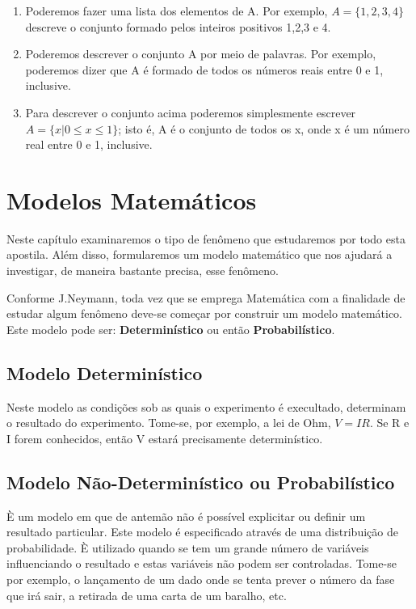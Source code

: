\documentclass[a4paper,12pt]{report}
\begin{document}
{\begin{enumerate}
    \item Poderemos fazer uma lista dos elementos de A. Por
    exemplo, $A = \{ 1,2,3,4 \}$ descreve o conjunto formado pelos
    inteiros positivos 1,2,3 e 4.
    \item Poderemos descrever o conjunto A por meio de palavras.
    Por exemplo, poderemos dizer que A é formado de todos os
    números reais entre 0 e 1, inclusive.
    \item Para descrever o conjunto acima poderemos simplesmente
    escrever $A = \{ x|0\leq x \leq 1 \}$; isto é, A é o conjunto
    de todos os x, onde x é um número real entre 0 e 1, inclusive.
\end{enumerate}







\section{Modelos Matemáticos}

Neste capítulo examinaremos o tipo de fenômeno que estudaremos por
todo esta apostila. Além disso, formularemos um modelo matemático
que nos ajudará a investigar, de maneira bastante precisa, esse
fenômeno.\vskip0.3cm

Conforme J.Neymann, toda vez que se emprega Matemática com a
finalidade de estudar algum fenômeno deve-se começar por construir
um modelo matemático. Este modelo pode ser:
\textbf{Determinístico} ou então \textbf{Probabilístico}.


\subsection{Modelo Determinístico}
Neste modelo as condições sob as quais o experimento é execultado,
determinam o resultado do experimento. Tome-se, por exemplo, a lei
de Ohm, $V = IR$. Se R e I forem conhecidos, então V estará
precisamente determinístico.


\subsection{Modelo Não-Determinístico ou Probabilístico}
È um modelo em que de antemão não é possível explicitar ou definir
um resultado particular. Este modelo é especificado através de uma
distribuição de probabilidade. È utilizado quando se tem um grande
número de variáveis influenciando o resultado e estas variáveis
não podem ser controladas. Tome-se por exemplo, o lançamento de um
dado onde se tenta prever o número da fase que irá sair, a
retirada de uma carta de um baralho, etc.


}
\end{document}
